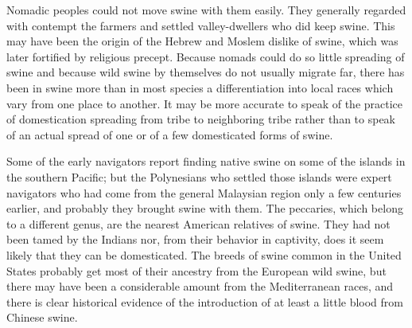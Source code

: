 Nomadic peoples could not move swine with them easily. They generally regarded with contempt the farmers and
settled valley-dwellers who did keep swine. This may have been the origin of the Hebrew and Moslem dislike of
swine, which was later fortified by religious precept. Because nomads could do so little spreading of swine
and because wild swine by themselves do not usually migrate far, there has been in swine more than in most
species a differentiation into local races which vary from one place to another. It may be more accurate to
speak of the practice of domestication spreading from tribe to neighboring tribe rather than to speak of an
actual spread of one or of a few domesticated forms of swine.

Some of the early navigators report finding native swine on some of the islands in the southern Pacific; but
the Polynesians who settled those islands were expert navigators who had come from the general Malaysian region
only a few centuries earlier, and probably they brought swine with them. The peccaries, which belong to a
different genus, are the nearest American relatives of swine. They had not been tamed by the Indians nor, from
their behavior in captivity, does it seem likely that they can be domesticated. The breeds of swine common in
the United States probably get most of their ancestry from the European wild swine, but there may have been a
considerable amount from the Mediterranean races, and there is clear historical evidence of the introduction
of at least a little blood from Chinese swine.

